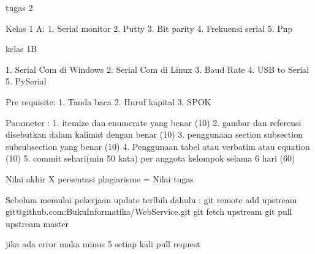 tugas 2

Kelas 1 A:
1. Serial monitor
2. Putty
3. Bit parity
4. Frekuensi serial
5. Pnp

kelas 1B

1. Serial Com di Windows
2. Serial Com di Linux
3. Baud Rate
4. USB to Serial
5. PySerial

Pre requisite:
1. Tanda baca
2. Huruf kapital
3. SPOK

Parameter :
1. itemize dan enumerate yang benar (10)
2. gambar dan referensi disebutkan dalam kalimat dengan benar (10)
3. penggunaan section subsection subsubsection yang benar (10)
4. Penggunaan tabel atau verbatim atau equation (10)
5. commit sehari(min 50 kata) per anggota kelompok selama 6 hari (60)

Nilai akhir X persentasi plagiarisme = Nilai tugas

Sebelum memulai pekerjaan update terlbih dahulu :
git remote add upstream git@github.com:BukuInformatika/WebService.git
git fetch upstream
git pull upstream master

jika ada error maka minus 5 setiap kali pull request